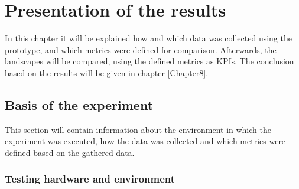 \chapter{Presentation of the results} %
\label{Chapter7}


In this chapter it will be explained how and which data was collected using the prototype, and which metrics were defined for comparison.
Afterwards, the landscapes will be compared, using the defined metrics as KPIs. The conclusion based on the results will be given in chapter \ref{Chapter8}.

\section{Basis of the experiment} 

This section will contain information about the environment in which the experiment was executed, how the data was collected and which metrics were defined based on the gathered data.

\subsection{Testing hardware and environment}

